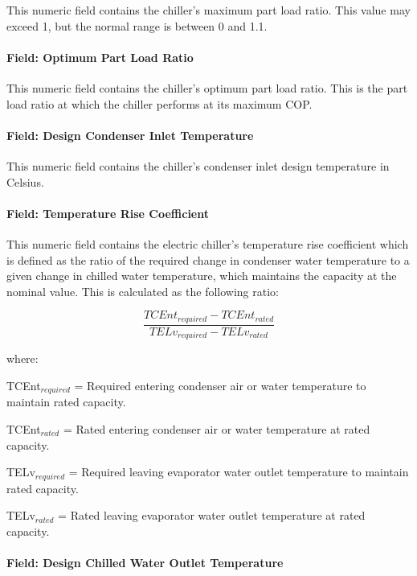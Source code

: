This numeric field contains the chiller's maximum part load ratio. This value may exceed 1, but the normal range is between 0 and 1.1.

\paragraph{Field: Optimum Part Load Ratio}\label{field-optimum-part-load-ratio-5}

This numeric field contains the chiller's optimum part load ratio. This is the part load ratio at which the chiller performs at its maximum COP.

\paragraph{Field: Design Condenser Inlet Temperature}\label{field-design-condenser-inlet-temperature-3}

This numeric field contains the chiller's condenser inlet design temperature in Celsius.

\paragraph{Field: Temperature Rise Coefficient}\label{field-temperature-rise-coefficient-1}

This numeric field contains the electric chiller's temperature rise coefficient which is defined as the ratio of the required change in condenser water temperature to a given change in chilled water temperature, which maintains the capacity at the nominal value. This is calculated as the following ratio:

\begin{equation}
\frac{{TCEn{t_{required}} - TCEn{t_{rated}}}}{{TEL{v_{required}} - TEL{v_{rated}}}}
\end{equation}

where:

TCEnt\(_{required}\) = Required entering condenser air or water temperature to maintain rated capacity.

TCEnt\(_{rated}\) = Rated entering condenser air or water temperature at rated capacity.

TELv\(_{required}\) = Required leaving evaporator water outlet temperature to maintain rated capacity.

TELv\(_{rated}\) = Rated leaving evaporator water outlet temperature at rated capacity.

\paragraph{Field: Design Chilled Water Outlet Temperature}\label{field-design-chilled-water-outlet-temperature-1}

